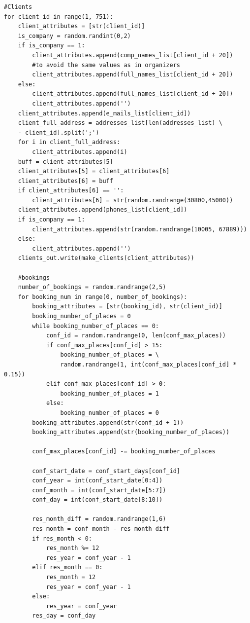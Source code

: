 \documentclass[12pt, a4paper]{mwrep}
\begin{document}
\begin{lstlisting}
#Clients
for client_id in range(1, 751):
    client_attributes = [str(client_id)]
    is_company = random.randint(0,2)
    if is_company == 1:
        client_attributes.append(comp_names_list[client_id + 20]) 
        #to avoid the same values as in organizers
        client_attributes.append(full_names_list[client_id + 20])
    else:
        client_attributes.append(full_names_list[client_id + 20])
        client_attributes.append('')
    client_attributes.append(e_mails_list[client_id])
    client_full_address = addresses_list[len(addresses_list) \
    - client_id].split(';')
    for i in client_full_address:
        client_attributes.append(i)
    buff = client_attributes[5]
    client_attributes[5] = client_attributes[6]
    client_attributes[6] = buff
    if client_attributes[6] == '':
        client_attributes[6] = str(random.randrange(30800,45000))
    client_attributes.append(phones_list[client_id])
    if is_company == 1:
        client_attributes.append(str(random.randrange(10005, 67889)))
    else:
        client_attributes.append('')
    clients_out.write(make_clients(client_attributes))
    
    #bookings
    number_of_bookings = random.randrange(2,5)
    for booking_num in range(0, number_of_bookings):
        booking_attributes = [str(booking_id), str(client_id)]
        booking_number_of_places = 0
        while booking_number_of_places == 0:
            conf_id = random.randrange(0, len(conf_max_places))
            if conf_max_places[conf_id] > 15:
                booking_number_of_places = \
                random.randrange(1, int(conf_max_places[conf_id] * 0.15))
            elif conf_max_places[conf_id] > 0:
                booking_number_of_places = 1
            else:
                booking_number_of_places = 0
        booking_attributes.append(str(conf_id + 1))
        booking_attributes.append(str(booking_number_of_places))
        
        conf_max_places[conf_id] -= booking_number_of_places
        
        conf_start_date = conf_start_days[conf_id]
        conf_year = int(conf_start_date[0:4])
        conf_month = int(conf_start_date[5:7])
        conf_day = int(conf_start_date[8:10])
        
        res_month_diff = random.randrange(1,6)
        res_month = conf_month - res_month_diff
        if res_month < 0:
            res_month %= 12
            res_year = conf_year - 1
        elif res_month == 0:
            res_month = 12
            res_year = conf_year - 1
        else:
            res_year = conf_year
        res_day = conf_day
        

\end{lstlisting}
\end{document}
